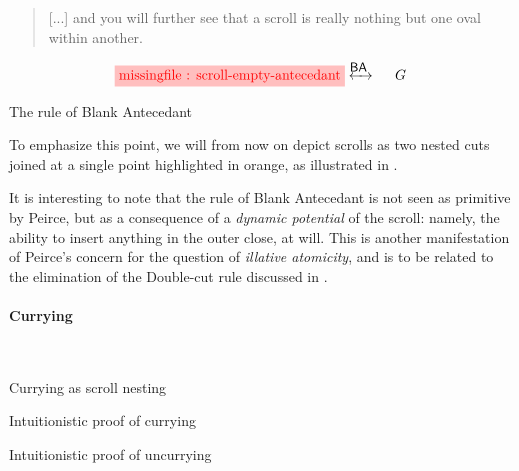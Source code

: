 \begin{quote}
  [...] and you will further see that a scroll is really nothing but one oval
within another.
\end{quote}

\begin{marginfigure}
  $$
  \!\!\!\!\stkfig{1}{scroll-empty-antecedant}
  \!\!\!\!\xinvstep{\rsf{BA}}~~~~
  G
  $$
  \caption{The rule of Blank Antecedant}
\end{marginfigure}

To emphasize this point, we will from now on depict scrolls as two nested cuts
joined at a single point highlighted in orange, as illustrated in
.

\begin{remark}
  It is interesting to note that the rule of Blank Antecedant is not seen as
  primitive by Peirce, but as a consequence of a \emph{dynamic potential} of the
  scroll: namely, the ability to insert anything in the outer close, at will.
  This is another manifestation of Peirce's concern for the question of
  \emph{illative atomicity}, and is to be related to the elimination of the
  Double-cut rule discussed in .
\end{remark}

\paragraph{Currying}

\begin{marginfigure}[-10em]
  ~~~
  \caption{Currying as scroll nesting}
\end{marginfigure}

\begin{marginfigure}[0em]
  
  \caption{Intuitionistic proof of currying}
\end{marginfigure}

\begin{marginfigure}[27em]
  
  \caption{Intuitionistic proof of uncurrying}
\end{marginfigure}

